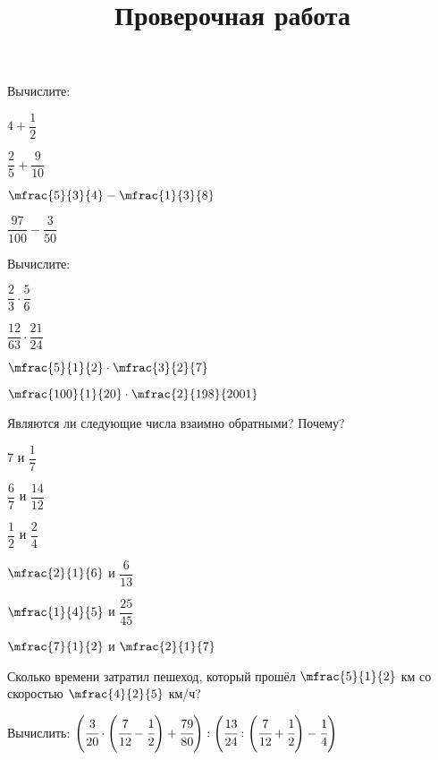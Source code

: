 %
\begin{exam}
	\title{Проверочная работа}
	\begin{listofex}
		\item Вычислите:
		\begin{enumcols}[itemcolumns=4]
			\item \( 4+\dfrac{1}{2} \)
			\item \( \dfrac{2}{5}+\dfrac{9}{10} \)
			\item \( \mfrac{5}{3}{4}-\mfrac{1}{3}{8} \)
			\item \( \dfrac{97}{100}-\dfrac{3}{50} \)
		\end{enumcols}
		\item Вычислите:
		\begin{enumcols}[itemcolumns=4]
			\item \( \dfrac{2}{3}\cdot\dfrac{5}{6} \)
			\item \( \dfrac{12}{63}\cdot\dfrac{21}{24} \)
			\item \( \mfrac{5}{1}{2}\cdot\mfrac{3}{2}{7} \)
			\item \( \mfrac{100}{1}{20}\cdot\mfrac{2}{198}{2001} \)
		\end{enumcols}
			\item Являются ли следующие числа взаимно обратными? Почему?
			\begin{enumcols}[itemcolumns=6]
				\item \( 7 \) и \( \dfrac{1}{7} \)
				\item \( \dfrac{6}{7} \) и \( \dfrac{14}{12} \)
				\item \( \dfrac{1}{2} \) и \( \dfrac{2}{4} \)
				\item \( \mfrac{2}{1}{6} \) и \( \dfrac{6}{13} \)
				\item \( \mfrac{1}{4}{5} \) и \( \dfrac{25}{45} \)
				\item \( \mfrac{7}{1}{2} \) и \( \mfrac{2}{1}{7} \)
			\end{enumcols}			
			\item Сколько времени затратил пешеход, который прошёл \( \mfrac{5}{1}{2} \) км со скоростью \( \mfrac{4}{2}{5} \) км/ч?
			\item Вычислить: \( \left( \cfrac{3}{20}\cdot\left( \cfrac{7}{12}-\cfrac{1}{2} \right)+\cfrac{79}{80} \right):\left( \cfrac{13}{24}:\left( \cfrac{7}{12}+\cfrac{1}{2} \right)-\cfrac{1}{4} \right) \)
	\end{listofex}
\end{exam}
%
